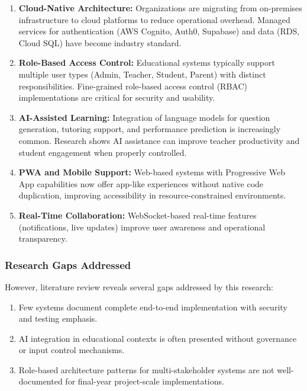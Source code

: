 \documentclass[11pt,a4paper]{article}
\begin{document}
\begin{enumerate}
    \item \textbf{Cloud-Native Architecture:} Organizations are migrating from on-premises infrastructure to cloud platforms to reduce operational overhead. Managed services for authentication (AWS Cognito, Auth0, Supabase) and data (RDS, Cloud SQL) have become industry standard.

    \item \textbf{Role-Based Access Control:} Educational systems typically support multiple user types (Admin, Teacher, Student, Parent) with distinct responsibilities. Fine-grained role-based access control (RBAC) implementations are critical for security and usability.

    \item \textbf{AI-Assisted Learning:} Integration of language models for question generation, tutoring support, and performance prediction is increasingly common. Research shows AI assistance can improve teacher productivity and student engagement when properly controlled.

    \item \textbf{PWA and Mobile Support:} Web-based systems with Progressive Web App capabilities now offer app-like experiences without native code duplication, improving accessibility in resource-constrained environments.

    \item \textbf{Real-Time Collaboration:} WebSocket-based real-time features (notifications, live updates) improve user awareness and operational transparency.
\end{enumerate}

\subsubsection{Research Gaps Addressed}

However, literature review reveals several gaps addressed by this research:

\begin{enumerate}
    \item Few systems document complete end-to-end implementation with security and testing emphasis.
    \item AI integration in educational contexts is often presented without governance or input control mechanisms.
    \item Role-based architecture patterns for multi-stakeholder systems are not well-documented for final-year project-scale implementations.
\end{enumerate}
\end{document}
